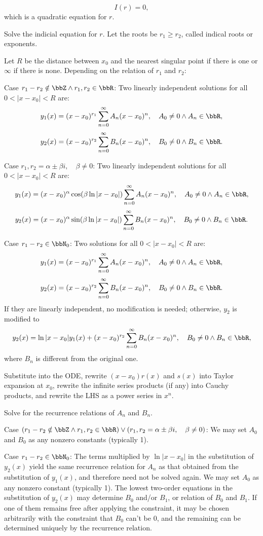 \documentclass[a4paper,12pt]{report}
\begin{document}
\[I(r)=0,\]
which is a quadratic equation for $r$.
\item Solve the indicial equation for $r$. Let the roots be $r_1\geq r_2$, called indical roots or exponents.
\item Let $R$ be the distance between $x_0$ and the nearest singular point if there is one or $\infty$ if there is none. Depending on the relation of $r_1$ and $r_2$:
\bit
\item Case $r_1-r_2\notin\bbZ\land r_1,r_2\in\bbR$: Two linearly independent solutions for all $0<|x-x_0|<R$ are:
\[y_1(x)=(x-x_0)^{r_1}\sum_{n=0}^{\infty}A_n(x-x_0)^n,\quad A_0\neq 0\land A_n\in\bbR,\]
\[y_2(x)=(x-x_0)^{r_2}\sum_{n=0}^{\infty}B_n(x-x_0)^n,\quad B_0\neq 0\land B_n\in\bbR.\]
\item Case $r_1,r_2=\alpha\pm\beta i,\quad\beta\ne0$: Two linearly independent solutions for all $0<|x-x_0|<R$ are:
\[y_1(x)=(x-x_0)^{\alpha}\cos(\beta\ln|x-x_0|)\sum_{n=0}^{\infty}A_n(x-x_0)^n,\quad A_0\neq 0\land A_n\in\bbR,\]
\[y_2(x)=(x-x_0)^{\alpha}\sin(\beta\ln|x-x_0|)\sum_{n=0}^{\infty}B_n(x-x_0)^n,\quad B_0\neq 0\land B_n\in\bbR.\]
\item Case $r_1-r_2\in\bbN_0$: Two solutions for all $0<|x-x_0|<R$ are:
\[y_1(x)=(x-x_0)^{r_1}\sum_{n=0}^{\infty}A_n(x-x_0)^n,\quad A_0\neq 0\land A_n\in\bbR,\]
\[y_2(x)=(x-x_0)^{r_2}\sum_{n=0}^{\infty}B_n(x-x_0)^n,\quad B_0\neq 0\land B_n\in\bbR.\]
If they are linearly independent, no modification is needed; otherwise, $y_2$ is modified to
\[y_2(x)=\ln|x-x_0|y_1(x)+(x-x_0)^{r_2}\sum_{n=0}^{\infty}B_n(x-x_0)^n,\quad B_0\neq 0\land B_n\in\bbR,\]
where $B_n$ is different from the original one.
\eit 
\item Substitute into the ODE, rewrite $(x-x_0)r(x)$ and $s(x)$ into Taylor expansion at $x_0$, rewrite the infinite series products (if any) into Cauchy products, and rewrite the LHS as a power series in $x^n$.
\item Solve for the recurrence relations of $A_n$ and $B_n$.
\bit
\item Case $(r_1-r_2\notin\bbZ\land r_1,r_2\in\bbR)\lor (r_1,r_2=\alpha\pm\beta i,\quad\beta\ne0)$: We may set $A_0$ and $B_0$ as any nonzero constants (typically 1).
\item Case $r_1-r_2\in\bbN_0$: The terms multiplied by $\ln|x-x_0|$ in the substitution of $y_2(x)$ yield the same recurrence relation for $A_n$ as that obtained from the substitution of $y_1(x)$, and therefore need not be solved again. We may set $A_0$ as any nonzero constant (typically 1). The lowest two-order equations in the substitution of $y_2(x)$ may determine $B_0$ and/or $B_1$, or relation of $B_0$ and $B_1$. If one of them remains free after applying the constraint, it may be chosen arbitrarily with the constraint that $B_0$ can't be 0, and the remaining can be determined uniquely by the recurrence relation.
\end{document}
